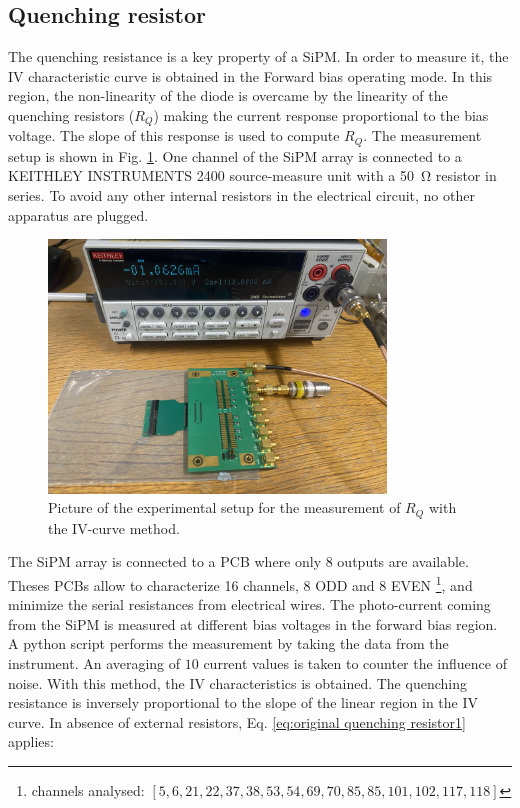 \subsection{Quenching resistor} 
\label{ch:experiement methods:IV:Rq IV}
The quenching resistance is a key property of a SiPM. In order to measure it, the IV characteristic curve is obtained in the Forward bias operating mode. In this region, the non-linearity of the diode is overcame by the linearity of the quenching resistors ($R_Q$) making the current response proportional to the bias voltage. The slope of this response is used to compute $R_Q$.
The measurement setup is shown in Fig. \ref{fig:pic IV rq setup}. One channel of the SiPM array is connected to a KEITHLEY INSTRUMENTS 2400 source-measure unit with a \SI{50}{\ohm} resistor in series. To avoid any other internal resistors in the electrical circuit, no other apparatus are plugged. 
\begin{figure}[htbp]
    \centering
    \includegraphics[width=0.8\textwidth]{gfx/pictures/Rq_IV_setup.png}
    \caption{Picture of the experimental setup for the measurement of $R_Q$ with the IV-curve method.}
    \label{fig:pic IV rq setup}
\end{figure}
The SiPM array is connected to a \ac{PCB} where only 8 outputs are available. Theses PCBs allow to characterize 16 channels, 8 ODD and 8 EVEN \footnote{channels analysed: $[5,6, 21,22, 37,38, 53,54, 69,70, 85,85, 101, 102, 117, 118]$}, and minimize the serial resistances from electrical wires. The photo-current coming from the SiPM is measured at different bias voltages in the forward bias region. 
A python script performs the measurement by taking the data from the instrument. An averaging of $10$ current values is taken to counter the influence of noise. 
With this method, the IV characteristics is obtained. The quenching resistance is inversely proportional to the slope of the linear region in the IV curve. In absence of external resistors,  Eq. \eqref{eq:original quenching resistor1} applies:
